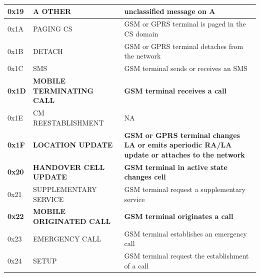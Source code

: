 \documentclass[master,english]{hgbthesis}
\begin{document}
{\begin{longtable}{|l|p{4cm}|p{8cm}|}
		0x19         & A OTHER                              & unclassified message on A                                                                                  \\ \hline
		0x1A         & PAGING CS                            & GSM or GPRS terminal is paged in the CS domain                                                             \\ \hline
		0x1B         & DETACH                               & GSM or GPRS terminal detaches from the network                                                             \\ \hline
		0x1C         & SMS                                  & GSM terminal sends or receives an SMS                                                                      \\ \hline
		\textbf{0x1D}         & \textbf{MOBILE TERMINATING CALL}              & \textbf{GSM terminal receives a call}                                                                               \\ \hline
		0x1E         & CM REESTABLISHMENT                   & NA                                                                                                         \\ \hline
		\textbf{0x1F}         & \textbf{LOCATION UPDATE}                      & \textbf{GSM or GPRS terminal changes LA or emits aperiodic RA/LA update or attaches to the network}                 \\ \hline
	\textbf{0x20}          & \textbf{HANDOVER CELL UPDATE}                 & \textbf{GSM terminal in active state changes cell}                                                                 \\ \hline
		0x21         & SUPPLEMENTARY SERVICE                & GSM terminal request a supplementary service                                                               \\ \hline
		\textbf{0x22}         & \textbf{MOBILE ORIGINATED CALL}               & \textbf{GSM terminal originates a call}                                                                             \\ \hline
		0x23         & EMERGENCY CALL                       & GSM terminal establishes an emergency call                                                                 \\ \hline
		0x24         & SETUP                                & GSM terminal request the establishment of a call                                                           \\ \hline

\end{longtable}}
\end{document}
